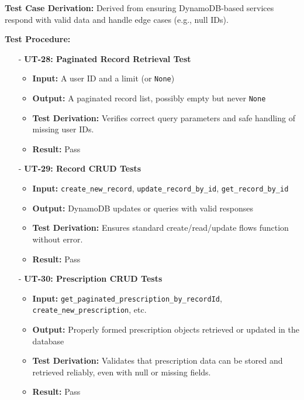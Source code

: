 \documentclass[12pt, titlepage]{article}
\begin{document}
\noindent \textbf{Test Case Derivation:}
Derived from ensuring DynamoDB-based services respond with valid data and handle edge cases (e.g., null IDs).
\vspace{10pt}

\noindent \textbf{Test Procedure:}
\begin{itemize}
    \item[-] \textbf{UT-28: Paginated Record Retrieval Test} \label{test:medrec-paginated}
    \begin{itemize}
        \item \textbf{Input:} A user ID and a limit (or \texttt{None})
        \item \textbf{Output:} A paginated record list, possibly empty but never \texttt{None}
        \item \textbf{Test Derivation:} Verifies correct query parameters and safe handling of missing user IDs.
        \item \textbf{Result:} Pass
    \end{itemize}

    \item[-] \textbf{UT-29: Record CRUD Tests} \label{test:medrec-crud}
    \begin{itemize}
        \item \textbf{Input:} \texttt{create\_new\_record}, \texttt{update\_record\_by\_id}, \texttt{get\_record\_by\_id}
        \item \textbf{Output:} DynamoDB updates or queries with valid responses
        \item \textbf{Test Derivation:} Ensures standard create/read/update flows function without error.
        \item \textbf{Result:} Pass
    \end{itemize}

    \item[-] \textbf{UT-30: Prescription CRUD Tests} \label{test:prescription-crud}
    \begin{itemize}
        \item \textbf{Input:} \texttt{get\_paginated\_prescription\_by\_recordId}, \texttt{create\_new\_prescription}, etc.
        \item \textbf{Output:} Properly formed prescription objects retrieved or updated in the database
        \item \textbf{Test Derivation:} Validates that prescription data can be stored and retrieved reliably, even with null or missing fields.
        \item \textbf{Result:} Pass
    \end{itemize}
\end{itemize}
\vspace{10pt}
\end{document}
